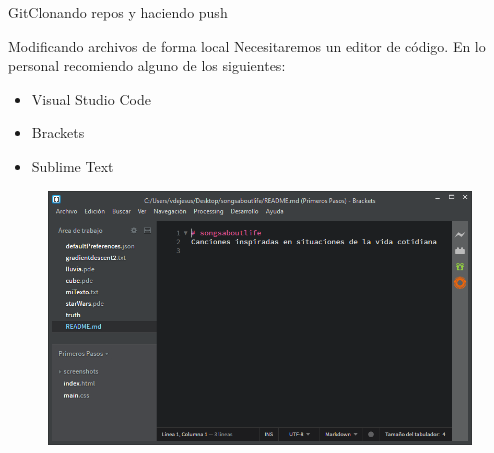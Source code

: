 \documentclass[10pt]{beamer}
\begin{document}
\begin{frame}{Git}{Clonando repos y haciendo push}

\begin{block}{Modificando archivos de forma local}
Necesitaremos un editor de código. En lo personal recomiendo alguno de los siguientes:

\begin{itemize}
    \item Visual Studio Code
    \item Brackets
    \item Sublime Text
\end{itemize}

\begin{figure}[h!]
\centering
\includegraphics [scale=0.3]{brackets}
\label{fig:brackets}
\end{figure}


\end{block}

\end{frame}
\end{document}
